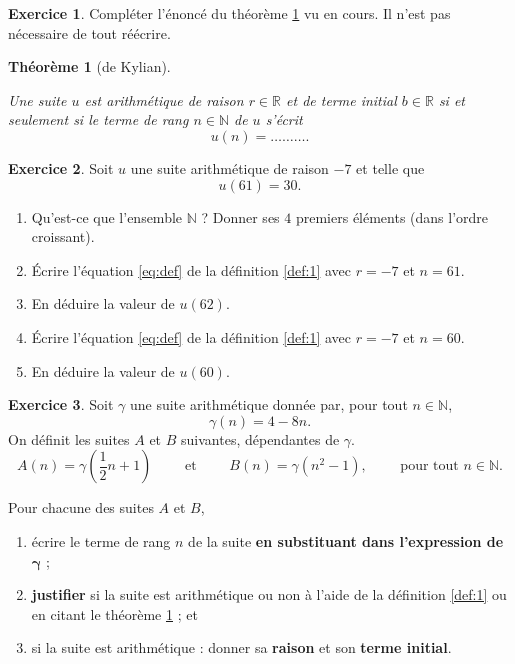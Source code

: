 \documentclass[12pt]{paper}
\theoremstyle{plain}
\newtheorem{theorem}{Th\'eor\`eme}
\theoremstyle{definition}
\newtheorem{ex}{Exercice}
\newcommand{\R}{\mathbb{R}}
\newcommand{\N}{\mathbb{N}}
\begin{document}
\begin{ex}
	Compléter l'énoncé du théorème \ref{thm:1} vu en cours. Il n'est pas nécessaire de tout réécrire.
\end{ex}

\begin{theorem}[de Kylian]\label{thm:1}
	
	Une suite $u$ est arithmétique de raison $r\in\R$ et de terme initial $b\in\R$ si et seulement si le terme de rang $n\in\N$ de $u$ s'écrit
		\[ u(n) = \dots\dots\dots.\]
		
\end{theorem}

\begin{ex}
	Soit $u$ une suite arithmétique de raison $-7$ et telle que
		\[u(61) = 30. \]
	\begin{enumerate}
		\item Qu'est-ce que l'ensemble $\N$ ? Donner ses $4$ premiers éléments (dans l'ordre croissant).
		\item Écrire l'équation \eqref{eq:def} de la définition \ref{def:1} avec $r=-7$ et $n=61$.
		\item En déduire la valeur de $u(62)$.
		\item Écrire l'équation \eqref{eq:def} de la définition \ref{def:1} avec $r=-7$ et $n=60$.
		\item En déduire la valeur de $u(60)$.
	\end{enumerate}
\end{ex}

\begin{ex}
	Soit $\gamma$ une suite arithmétique donnée par, pour tout $n\in\N$,
		\[ \gamma(n) = 4 -8n . \]
	On définit les suites $A$ et $B$ suivantes, dépendantes de $\gamma$.
		\[ A(n) = \gamma\left(\dfrac12n+1\right) \qquad \text{ et } \qquad B(n) = \gamma(n^2 - 1), \qquad \text{ pour tout }n\in\N. \]
		
	\newpage
	Pour chacune des suites $A$ et $B$, 
		\begin{enumerate}[leftmargin=2cm, label=\roman*)]
			\item écrire le terme de rang $n$ de la suite \textbf{en substituant dans l'expression de} $\boldsymbol{\gamma}$ ; 
			\item  \textbf{justifier} si la suite est arithmétique ou non à l'aide de la définition \ref{def:1} ou en citant le théorème \ref{thm:1} ; et
			\item si la suite est arithmétique : donner sa \textbf{raison} et son \textbf{terme initial}.
		\end{enumerate}
\end{ex}
\end{document}
